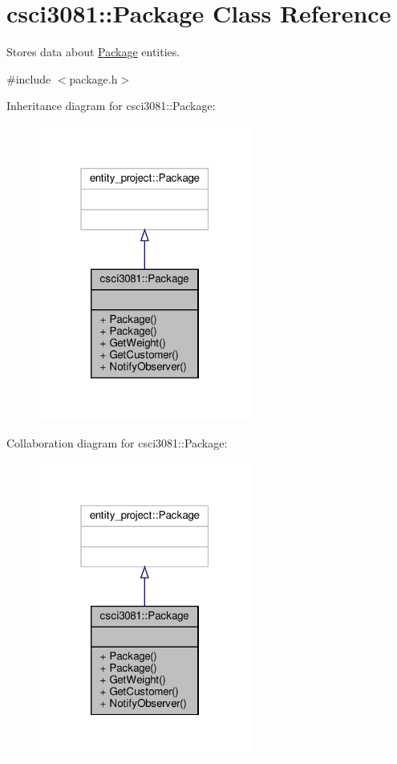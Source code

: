 \hypertarget{classcsci3081_1_1Package}{}\section{csci3081\+:\+:Package Class Reference}
\label{classcsci3081_1_1Package}


Stores data about \hyperlink{classcsci3081_1_1Package}{Package} entities.  




{\ttfamily \#include $<$package.\+h$>$}



Inheritance diagram for csci3081\+:\+:Package\+:\nopagebreak
\begin{figure}[H]
\begin{center}
\leavevmode
\includegraphics[width=199pt]{classcsci3081_1_1Package__inherit__graph}
\end{center}
\end{figure}


Collaboration diagram for csci3081\+:\+:Package\+:\nopagebreak
\begin{figure}[H]
\begin{center}
\leavevmode
\includegraphics[width=199pt]{classcsci3081_1_1Package__coll__graph}
\end{center}
\end{figure}
